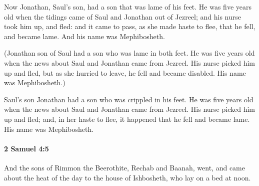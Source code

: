 			\begin{versebox}
					\item[BHS] 
					\item[ASV] Now Jonathan, Saul's son, had a son that was lame of his feet. He was five years old when the tidings came of Saul and Jonathan out of Jezreel; and his nurse took him up, and fled: and it came to pass, as she made haste to flee, that he fell, and became lame. And his name was Mephibosheth.
					\item[NIV] (Jonathan son of Saul had a son who was lame in both feet. He was five years old when the news about Saul and Jonathan came from Jezreel. His nurse picked him up and fled, but as she hurried to leave, he fell and became disabled. His name was Mephibosheth.)
					\item[NRSV] Saul’s son Jonathan had a son who was crippled in his feet. He was five years old when the news about Saul and Jonathan came from Jezreel. His nurse picked him up and fled; and, in her haste to flee, it happened that he fell and became lame. His name was Mephibosheth.
			\end{versebox}

		\paragraph{2 Samuel 4:5} %
			\label{2SAMUEL-4-5}

			And the sons of Rimmon the Beerothite, Rechab and Baanah, went, and came about the heat of the day to the house of Ishbosheth, who lay on a bed at noon.

